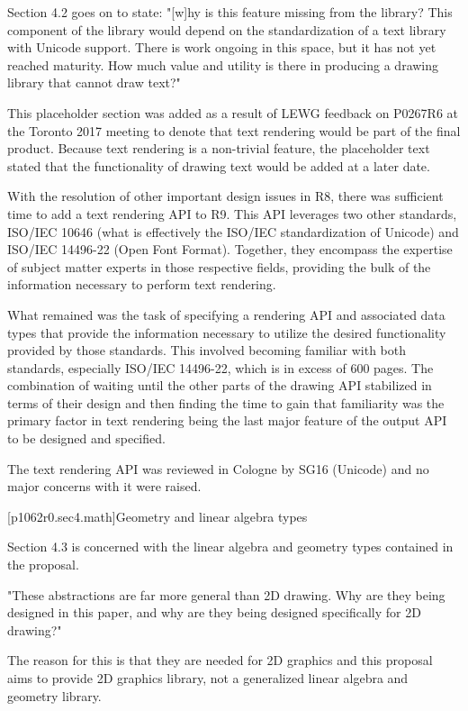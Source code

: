 \pnum
Section 4.2 goes on to state: "[w]hy is this feature missing from the library? This component of the library would depend on the standardization of a text library with Unicode support. There is work ongoing in this space, but it has not yet reached maturity. How much value and utility is there in producing a drawing library that cannot draw text?"

\pnum
This placeholder section was added as a result of LEWG feedback on P0267R6 at the Toronto 2017 meeting to denote that text rendering would be part of the final product. Because text rendering is a non-trivial feature, the placeholder text stated that the functionality of drawing text would be added at a later date.

\pnum
With the resolution of other important design issues in R8, there was sufficient time to add a text rendering API to R9. This API leverages two other standards, ISO/IEC 10646 (what is effectively the ISO/IEC standardization of Unicode) and ISO/IEC 14496-22 (Open Font Format). Together, they encompass the expertise of subject matter experts in those respective fields, providing the bulk of the information necessary to perform text rendering.

\pnum
What remained was the task of specifying a rendering API and associated data types that provide the information necessary to utilize the desired functionality provided by those standards. This involved becoming familiar with both standards, especially ISO/IEC 14496-22, which is in excess of 600 pages. The combination of waiting until the other parts of the drawing API stabilized in terms of their design and then finding the time to gain that familiarity was the primary factor in text rendering being the last major feature of the output API to be designed and specified.

\pnum
\begin{note}
The text rendering API was reviewed in Cologne by SG16 (Unicode) and no major concerns with it were raised.
\end{note}

[p1062r0.sec4.math]{Geometry and linear algebra types}

\pnum
Section 4.3 is concerned with the linear algebra and geometry types contained in the proposal.

\pnum
"These abstractions are far more general than 2D drawing. Why are they being designed in this paper, and why are they being designed specifically for 2D drawing?"

\pnum
The reason for this is that they are needed for 2D graphics and this proposal aims to provide 2D graphics library, not a generalized linear algebra and geometry library.

